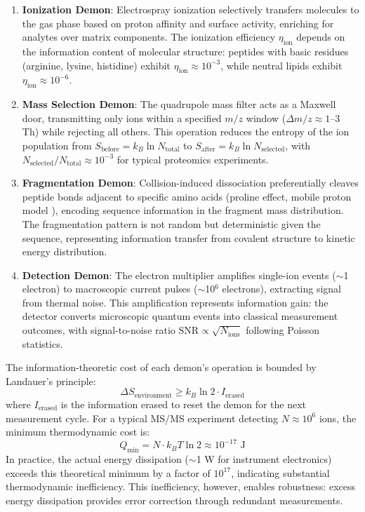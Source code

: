 \documentclass[11pt,twocolumn]{article}
\newcommand{\msms}{MS/MS}
\begin{document}
\begin{enumerate}[leftmargin=*]
    \item \textbf{Ionization Demon}: Electrospray ionization selectively transfers molecules to the gas phase based on proton affinity and surface activity, enriching for analytes over matrix components. The ionization efficiency $\eta_{\text{ion}}$ depends on the information content of molecular structure: peptides with basic residues (arginine, lysine, histidine) exhibit $\eta_{\text{ion}} \approx 10^{-3}$, while neutral lipids exhibit $\eta_{\text{ion}} \approx 10^{-6}$.
    
    \item \textbf{Mass Selection Demon}: The quadrupole mass filter acts as a Maxwell door, transmitting only ions within a specified $m/z$ window ($\Delta m/z \approx 1$--3 Th) while rejecting all others. This operation reduces the entropy of the ion population from $S_{\text{before}} = k_B \ln N_{\text{total}}$ to $S_{\text{after}} = k_B \ln N_{\text{selected}}$, with $N_{\text{selected}}/N_{\text{total}} \approx 10^{-3}$ for typical proteomics experiments.
    
    \item \textbf{Fragmentation Demon}: Collision-induced dissociation preferentially cleaves peptide bonds adjacent to specific amino acids (proline effect, mobile proton model \cite{wysocki2000mobile}), encoding sequence information in the fragment mass distribution. The fragmentation pattern is not random but deterministic given the sequence, representing information transfer from covalent structure to kinetic energy distribution.
    
    \item \textbf{Detection Demon}: The electron multiplier amplifies single-ion events ($\sim$1 electron) to macroscopic current pulses ($\sim$10$^6$ electrons), extracting signal from thermal noise. This amplification represents information gain: the detector converts microscopic quantum events into classical measurement outcomes, with signal-to-noise ratio $\text{SNR} \propto \sqrt{N_{\text{ions}}}$ following Poisson statistics.
\end{enumerate}

The information-theoretic cost of each demon's operation is bounded by Landauer's principle:
\begin{equation}
    \Delta S_{\text{environment}} \geq k_B \ln 2 \cdot I_{\text{erased}}
\end{equation}
where $I_{\text{erased}}$ is the information erased to reset the demon for the next measurement cycle. For a typical \msms{} experiment detecting $N \approx 10^6$ ions, the minimum thermodynamic cost is:
\begin{equation}
    Q_{\text{min}} = N \cdot k_B T \ln 2 \approx 10^{-17} \text{ J}
\end{equation}
In practice, the actual energy dissipation ($\sim$1 W for instrument electronics) exceeds this theoretical minimum by a factor of $10^{17}$, indicating substantial thermodynamic inefficiency. This inefficiency, however, enables robustness: excess energy dissipation provides error correction through redundant measurements.
\end{document}
